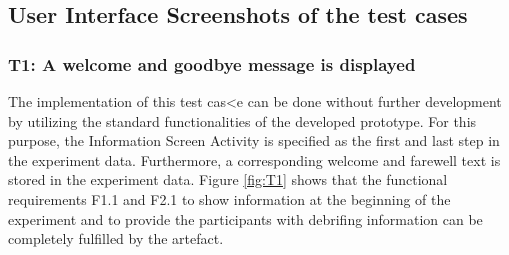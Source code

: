 \newpage\subsection*{User Interface Screenshots of the test cases}\label{appendix:testcases}


\subsubsection*{T1: A welcome and goodbye message is displayed} 

The implementation of this test cas<e can be done without further development by utilizing the standard functionalities of the developed prototype. For this purpose, the Information Screen Activity is specified as the first and last step in the experiment data. Furthermore, a corresponding welcome and farewell text is stored in the experiment data. Figure \ref{fig:T1} shows that the functional requirements F1.1 and F2.1 to show information at the beginning of the experiment and to provide the participants with debrifing information can be completely fulfilled by the artefact.

